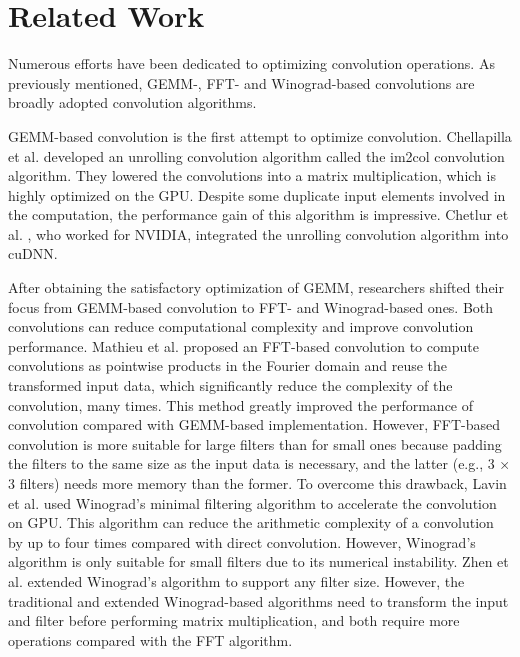 \section{Related Work}
Numerous efforts have been dedicated to optimizing convolution operations. As previously mentioned, GEMM-, FFT- and
Winograd-based convolutions are broadly adopted convolution algorithms.

GEMM-based convolution is the first attempt to optimize convolution. Chellapilla et al. \cite{Chellapilla2006High} developed an unrolling
convolution algorithm  called the im2col convolution algorithm. They lowered the convolutions into a matrix multiplication, which is
highly optimized on the GPU. Despite some duplicate input elements involved in the computation, the performance gain of this algorithm is impressive. Chetlur et al. \cite{ChetlurWVCTCS14}, who worked for NVIDIA, integrated the unrolling convolution algorithm into cuDNN.

After obtaining the satisfactory optimization of GEMM, researchers shifted their focus from GEMM-based convolution to FFT- and
Winograd-based ones. Both convolutions can reduce computational complexity and improve convolution performance. Mathieu et al.
\cite{mathieu2013fast} proposed an FFT-based convolution to compute convolutions as pointwise products in the Fourier domain and reuse the
transformed input data, which significantly reduce the complexity of the convolution, many times. This method greatly improved the
performance of convolution compared with GEMM-based implementation. However, FFT-based convolution is more suitable for large filters than
for small ones because padding the filters to the same size as the input data is necessary, and  the latter (e.g., 3 × 3 filters) needs
more memory than the former. To overcome this drawback, Lavin et al. \cite{lavin2016fast} used Winograd's minimal filtering algorithm to
accelerate the convolution on GPU. This algorithm can reduce the arithmetic complexity of a convolution by up to four times compared with
direct convolution. However, Winograd's algorithm is only suitable for small filters due to its numerical instability.
Zhen et al. \cite{Zhen2018Optimizing} extended Winograd's algorithm to support any filter size. However, the traditional and extended Winograd-based
algorithms need to transform the input and filter before performing matrix multiplication, and both require more operations compared with
the FFT algorithm.

